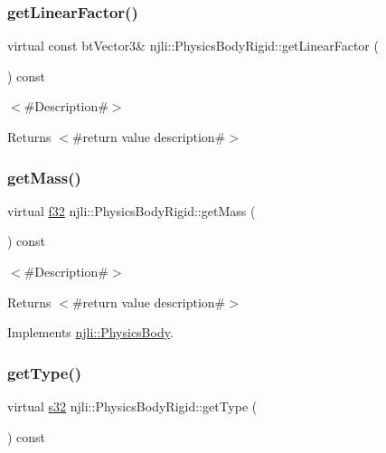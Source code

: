 \subsubsection{\texorpdfstring{get\+Linear\+Factor()}{getLinearFactor()}}
{\footnotesize\ttfamily virtual const bt\+Vector3\& njli\+::\+Physics\+Body\+Rigid\+::get\+Linear\+Factor (\begin{DoxyParamCaption}{ }\end{DoxyParamCaption}) const\hspace{0.3cm}{\ttfamily [virtual]}}

$<$\#\+Description\#$>$

\begin{DoxyReturn}{Returns}
$<$\#return value description\#$>$ 
\end{DoxyReturn}
\mbox{\label{classnjli_1_1_physics_body_rigid_a91e536e02eac21b097654263c6298f1b}} 
\subsubsection{\texorpdfstring{get\+Mass()}{getMass()}}
{\footnotesize\ttfamily virtual \mbox{\hyperlink{_util_8h_a5f6906312a689f27d70e9d086649d3fd}{f32}} njli\+::\+Physics\+Body\+Rigid\+::get\+Mass (\begin{DoxyParamCaption}{ }\end{DoxyParamCaption}) const\hspace{0.3cm}{\ttfamily [virtual]}}

$<$\#\+Description\#$>$

\begin{DoxyReturn}{Returns}
$<$\#return value description\#$>$ 
\end{DoxyReturn}


Implements \mbox{\hyperlink{classnjli_1_1_physics_body_a6f86b5736d90e252ec239357835377e9}{njli\+::\+Physics\+Body}}.

\mbox{\label{classnjli_1_1_physics_body_rigid_a701c7a02bd440b03982d7f9509baca03}} 
\subsubsection{\texorpdfstring{get\+Type()}{getType()}}
{\footnotesize\ttfamily virtual \mbox{\hyperlink{_util_8h_aa62c75d314a0d1f37f79c4b73b2292e2}{s32}} njli\+::\+Physics\+Body\+Rigid\+::get\+Type (\begin{DoxyParamCaption}{ }\end{DoxyParamCaption}) const\hspace{0.3cm}{\ttfamily [virtual]}}

